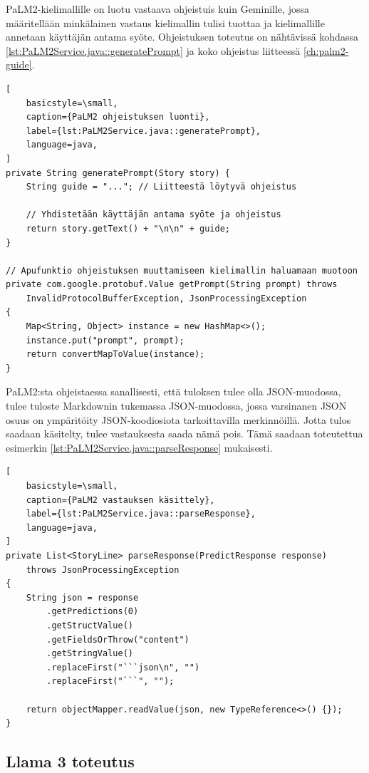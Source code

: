 PaLM2-kielimallille on luotu vastaava ohjeistuis kuin Geminille, jossa
määritellään minkälainen vastaus kielimallin tulisi tuottaa ja kielimallille
annetaan käyttäjän antama syöte. Ohjeistuksen toteutus on nähtävissä kohdassa
\ref{lst:PaLM2Service.java::generatePrompt} ja koko ohjeistus liitteessä \ref{ch:palm2-guide}.

\begin{lstlisting}[
    basicstyle=\small,
    caption={PaLM2 ohjeistuksen luonti},
    label={lst:PaLM2Service.java::generatePrompt},
    language=java,
]
private String generatePrompt(Story story) {
    String guide = "..."; // Liitteestä löytyvä ohjeistus

    // Yhdistetään käyttäjän antama syöte ja ohjeistus
    return story.getText() + "\n\n" + guide;
}

// Apufunktio ohjeistuksen muuttamiseen kielimallin haluamaan muotoon
private com.google.protobuf.Value getPrompt(String prompt) throws
    InvalidProtocolBufferException, JsonProcessingException
{
    Map<String, Object> instance = new HashMap<>();
    instance.put("prompt", prompt);
    return convertMapToValue(instance);
}
\end{lstlisting}

PaLM2:sta ohjeistaessa sanallisesti, että tuloksen tulee olla JSON-muodossa,
tulee tuloste Markdownin tukemassa JSON-muodossa, jossa varsinanen JSON osuus
on ympäritöity JSON-koodiosiota tarkoittavilla merkinnöillä. Jotta tulos
saadaan käsitelty, tulee vastauksesta saada nämä pois. Tämä saadaan toteutettua
esimerkin \ref{lst:PaLM2Service.java::parseResponse} mukaisesti.

\begin{lstlisting}[
    basicstyle=\small,
    caption={PaLM2 vastauksen käsittely},
    label={lst:PaLM2Service.java::parseResponse},
    language=java,
]
private List<StoryLine> parseResponse(PredictResponse response)
    throws JsonProcessingException
{
    String json = response
        .getPredictions(0)
        .getStructValue()
        .getFieldsOrThrow("content")
        .getStringValue()
        .replaceFirst("```json\n", "")
        .replaceFirst("```", "");

    return objectMapper.readValue(json, new TypeReference<>() {});
}
\end{lstlisting}

\subsection{Llama 3 toteutus}

